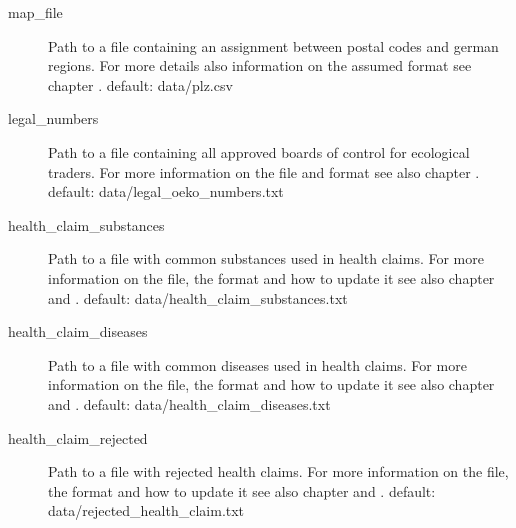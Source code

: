 \documentclass[letterpaper,10pt,english]{sphinxmanual}
\begin{document}
\begin{description}
\item[{map\_file}] \leavevmode
Path to a file containing an assignment between postal codes and
german regions. For more details also information on the assumed
format see chapter {\hyperref[\detokenize{external_data:external-postal-code}]{}}. default:
data/plz.csv

\item[{legal\_numbers}] \leavevmode
Path to a file containing all approved boards of control for
ecological traders. For more information on the file and format see
also chapter {\hyperref[\detokenize{external_data:external-legal-numbers}]{}}. default:
data/legal\_oeko\_numbers.txt

\item[{health\_claim\_substances}] \leavevmode
Path to a file with common substances used in health claims. For
more information on the file, the format and how to update it see
also chapter {\hyperref[\detokenize{external_data:external-hc-substances}]{}} and
{\hyperref[\detokenize{online_learning:substances-online}]{}}. default:
data/health\_claim\_substances.txt

\item[{health\_claim\_diseases}] \leavevmode
Path to a file with common diseases used in health claims. For more
information on the file, the format and how to update it see also
chapter {\hyperref[\detokenize{external_data:external-hc-disease}]{}} and
{\hyperref[\detokenize{online_learning:diseases-online}]{}}. default: data/health\_claim\_diseases.txt

\item[{health\_claim\_rejected}] \leavevmode
Path to a file with rejected health claims. For more information on
the file, the format and how to update it see also chapter
{\hyperref[\detokenize{external_data:external-hc-rejected}]{}} and {\hyperref[\detokenize{online_learning:rejected-online}]{}}. default:
data/rejected\_health\_claim.txt


\end{description}
\end{document}

